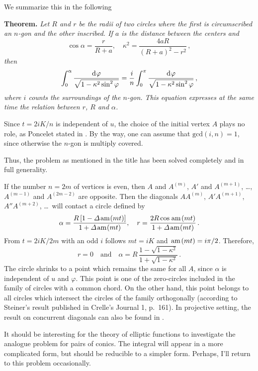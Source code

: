 We summarize this in the following

\smallskip\noindent
{\bf Theorem.} {\em Let $R$ and $r$ be the radii of two circles where the first is circumscribed an $n$-gon and the other inscribed.
If $a$ is the distance between the centers and
\[ \cos\alpha = \frac{r}{R+a}, \quad \kappa^2 = \frac{4aR}{(R+a)^2 - r^2}\,,
\]
then 
\[  \int_0^{\alpha} \frac{\mathrm{d}\mskip 1mu\varphi}
     {\sqrt{1 - \kappa^2\sin^2\varphi}} =
    \frac in \int_0^\pi \frac{\mathrm{d}\mskip 1mu\varphi}
    {\sqrt{1 - \kappa^2\sin^2\varphi}}\,,
\]
where $i$ counts the surroundings of the $n$-gon.
This equation expresses at the same time the relation between $r$, $R$ and $\alpha$.}

\smallskip
Since $t = 2iK/n$ is independent of $u$, the choice of the initial vertex $A$ plays no role, as Poncelet stated in \cite{poncelet1822}.
By the way, one can assume that $\mbox{gcd}(i,n)=1$, since otherwise the $n$-gon is multiply covered.

Thus, the problem as mentioned in the title has been solved completely and in full generality.

\goodbreak
\bigskip{}

\medskip\noindent
If the number $n = 2m$ of vertices is even, then $A$ and $A^{(m)}$, $A'$ and $A^{(m+1)}$, \dots, $A^{(m-1)}$ and $A^{(2m-2)}$ are opposite.
Then the diagonals $AA^{(m)}$, $A'A^{(m+1)}$, $A''A^{(m+2)}$, \dots\ will contact a circle defined by
\[   \alpha = \frac{R\,[1 - \varDelta\mskip 2mu\mbox{am}\mskip 1mu(mt)]}{1 + \varDelta\mskip 2mu\mbox{am}\mskip 1mu(mt)}, \quad
     r = \frac{2R\cos\mskip 2mu\mbox{am}\mskip 2mu(mt)}{1 + \varDelta\mskip 2mu\mbox{am}\mskip 1mu(mt)}\,.
\]     
From $t = 2iK/2m$ with an odd $i$ follows $mt = iK$ and $\mskip 2mu\mbox{am}\mskip 2mu(mt) = i\pi/2$.
Therefore,
\[  r = 0 \quad\mbox{and}\quad 
    \alpha = R\,\frac{1 - \sqrt{1-\kappa^2}}{1 + \sqrt{1-\kappa^2}}\,.
\]
The circle shrinks to a point which remains the same for all $A$, since $\alpha$ is independent of $u$ and $\varphi$.
This point is one of the zero-circles included in the family of circles with a common chord.
On the other hand, this point belongs to all circles which intersect the circles of the family orthogonally (according to Steiner's result published in Crelle's Journal 1, p.~161).
In projective setting, the result on concurrent diagonals can also be found in \cite[p.~364]{poncelet1822}.

It should be interesting for the theory of elliptic functions to investigate the analogue problem for pairs of conics.
The integral will appear in a more complicated form, but should be reducible to a simpler form.
Perhaps, I'll return to this problem occasionally. 

